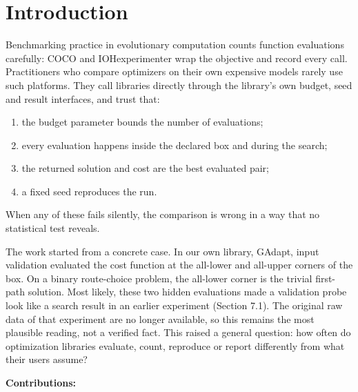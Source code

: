 \documentclass[acmsmall,screen,review,anonymous=false]{acmart}
\providecommand{\tightlist}{\setlength{\itemsep}{0pt}\setlength{\parskip}{0pt}}
\begin{document}
\section{Introduction}\label{introduction}

Benchmarking practice in evolutionary computation counts function evaluations carefully: COCO \citep{Hansen_2020}
and IOHexperimenter \citep{de_Nobel_2024} wrap the objective and record every call. Practitioners who compare
optimizers on their own expensive models rarely use such platforms. They call libraries directly through the
library's own budget, seed and result interfaces, and trust that:

\begin{enumerate}
\def\labelenumi{\arabic{enumi}.}
\tightlist
\item
  the budget parameter bounds the number of evaluations;
\item
  every evaluation happens inside the declared box and during the search;
\item
  the returned solution and cost are the best evaluated pair;
\item
  a fixed seed reproduces the run.
\end{enumerate}

When any of these fails silently, the comparison is wrong in a way that no statistical test reveals.

The work started from a concrete case. In our own library, GAdapt, input validation evaluated the cost function at
the all-lower and all-upper corners of the box. On a binary route-choice problem, the all-lower corner is the trivial
first-path solution. Most likely, these two hidden evaluations made a validation probe look like a search result in
an earlier experiment (Section 7.1). The original raw data of that experiment are no longer available, so this
remains the most plausible reading, not a verified fact. This raised a general question: how often do optimization libraries evaluate, count,
reproduce or report differently from what their users assume?

\textbf{Contributions:}
\end{document}
